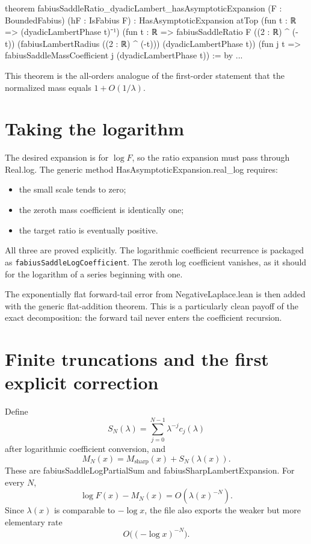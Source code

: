 \documentclass[11pt,a4paper,openany]{book}
\def\module#1{#1.lean}
\def\decl#1{#1}
\def\code#1{#1}
\newcommand{\module}[1]{\nolinkurl{#1.lean}}
\newcommand{\decl}[1]{\texttt{\detokenize{#1}}}
\newcommand{\code}[1]{\texttt{\detokenize{#1}}}
\newcommand{\pathbreak}[1]{\nolinkurl{#1}}
\begin{document}
\begin{LeanCode}
theorem fabiusSaddleRatio_dyadicLambert_hasAsymptoticExpansion
    (F : BoundedFabius) (hF : IsFabius F) :
    HasAsymptoticExpansion atTop
      (fun t : ℝ => (dyadicLambertPhase t)⁻¹)
      (fun t : ℝ => fabiusSaddleRatio F ((2 : ℝ) ^ (-t))
        (fabiusLambertRadius ((2 : ℝ) ^ (-t)))
        (dyadicLambertPhase t))
      (fun j t =>
        fabiusSaddleMassCoefficient j (dyadicLambertPhase t)) := by
  ...
\end{LeanCode}

This theorem is the all-orders analogue of the first-order statement that the
normalized mass equals $1+O(1/\lambda)$.

\section{Taking the logarithm}
The desired expansion is for $\log F$, so the ratio expansion must pass through
\code{Real.log}.  The generic method \decl{HasAsymptoticExpansion.real_log}
requires:
\begin{itemize}
  \item the small scale tends to zero;
  \item the zeroth mass coefficient is identically one;
  \item the target ratio is eventually positive.
\end{itemize}
All three are proved explicitly.  The logarithmic coefficient recurrence is
packaged as \pathbreak{fabiusSaddleLogCoefficient}.  The zeroth log coefficient
vanishes, as it should for the logarithm of a series beginning with one.

The exponentially flat forward-tail error from \module{NegativeLaplace} is
then added with the generic flat-addition theorem.  This is a particularly clean
payoff of the exact decomposition: the forward tail never enters the coefficient
recursion.

\section{Finite truncations and the first explicit correction}
Define
\[
 S_N(\lambda)=\sum_{j=0}^{N-1}
 \lambda^{-j}c_j(\lambda)
\]
after logarithmic coefficient conversion, and
\[
 M_N(x)=M_{\mathrm{sharp}}(x)+S_N(\lambda(x)).
\]
These are \decl{fabiusSaddleLogPartialSum} and
\decl{fabiusSharpLambertExpansion}.  For every $N$,
\[
 \log F(x)-M_N(x)=O(\lambda(x)^{-N}).
\]
Since $\lambda(x)$ is comparable to $-\log x$, the file also exports the weaker
but more elementary rate
\[
 O\bigl(({-\log x})^{-N}\bigr).
\]
\end{document}
